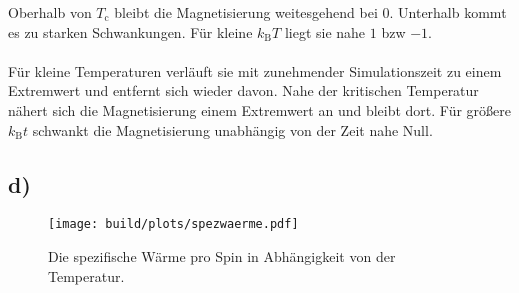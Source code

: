 Oberhalb von $T_\text{c}$ bleibt die Magnetisierung weitesgehend bei $0$. Unterhalb kommt es zu starken Schwankungen.
Für kleine $k_\text{B} T$ liegt sie nahe $1$ bzw $-1$. \\ \\
Für kleine Temperaturen verläuft sie mit zunehmender Simulationszeit zu einem Extremwert und entfernt sich wieder davon.
Nahe der kritischen Temperatur nähert sich die Magnetisierung einem Extremwert an und bleibt dort.
Für größere $k_\text{B} t$ schwankt die Magnetisierung unabhängig von der Zeit nahe Null.


\subsection*{d)}

\begin{figure}
  \texttt{[image: build/plots/spezwaerme.pdf]}
  \caption{Die spezifische Wärme pro Spin in Abhängigkeit von der Temperatur.}
  \label{}
\end{figure}









